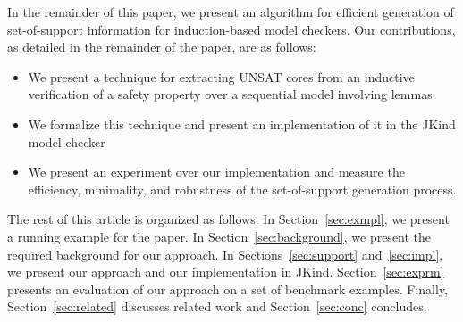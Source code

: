 In the remainder of this paper, we present an algorithm for efficient generation of set-of-support information for induction-based model checkers.  Our contributions, as detailed in the remainder of the paper, are as follows: 

\begin{itemize}
    \item We present a technique for extracting UNSAT cores from an inductive verification of a safety property over a sequential model involving lemmas.
    \item We formalize this technique and present an implementation of it in the JKind model checker~\cite{jkind}
    \item We present an experiment over our implementation and measure the efficiency, minimality, and robustness of the set-of-support generation process.
\end{itemize}

The rest of this article is organized as follows. In Section~\ref{sec:exmpl}, we present a running example for the paper.  In Section~\ref{sec:background}, we present the required background for our approach.  In Sections~\ref{sec:support} and~\ref{sec:impl}, we present our approach and our implementation in JKind.  Section~\ref{sec:exprm} presents an evaluation of our approach on a set of benchmark examples.  Finally, Section~\ref{sec:related} discusses related work and Section~\ref{sec:conc} concludes.

\iffalse
\begin{itemize}
    \item Overview of the problem: sequential model checkers do not provide much insight into proofs.
    \item Section should roughly follow the structure of "Finding Minimal Unsatisfiable Cores of
        Declarative Specifications" paper by Torlak et al (with Dan Jackson).
    \item UNSAT Cores have been used for a variety of analysis tasks
    \item we want to generalize this idea for sequential systems
\end{itemize}
\fi
  
